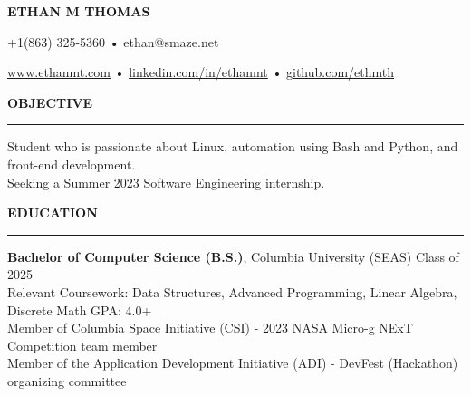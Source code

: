 \documentclass[10pt,letterpaper]{article}
\begin{document}
\begingroup
\centerline{\MakeUppercase{\LARGE\bf Ethan M Thomas}}
\medskip
\endgroup

\begingroup
\centerline{+1(863) 325-5360 • ethan@smaze.net}
\endgroup
\par

\begingroup
\centerline{\href{www.ethanmt.com}{www.ethanmt.com} • \href{https://www.linkedin.com/in/ethanmt/}{linkedin.com/in/ethanmt} • \href{https://github.com/ethmth}{github.com/ethmth}}
\endgroup
\par


\medskip
\MakeUppercase{{\bf Objective}} %
\medskip
\hrule %
\begin{list}{}{\setlength{\leftmargin}{0em}}
    \item
          {Student who is passionate about Linux, automation using Bash and Python, and front-end development.
          \\ Seeking a Summer 2023 Software Engineering internship.}
\end{list}


\medskip
\MakeUppercase{{\bf Education}}
\medskip
\hrule
\begin{list}{}{\setlength{\leftmargin}{0em}}
    \item
          {\bf Bachelor of Computer Science (B.S.)}, Columbia University (SEAS) \hfill  {Class of 2025}\\
          Relevant Coursework: Data Structures, Advanced Programming, Linear Algebra, Discrete Math \hfill {GPA: 4.0+}
          \medskip
          \\
          Member of Columbia Space Initiative (CSI) - 2023 NASA Micro-g NExT Competition team member \\
          Member of the Application Development Initiative (ADI) - DevFest (Hackathon) organizing committee
\end{list}


\end{document}
